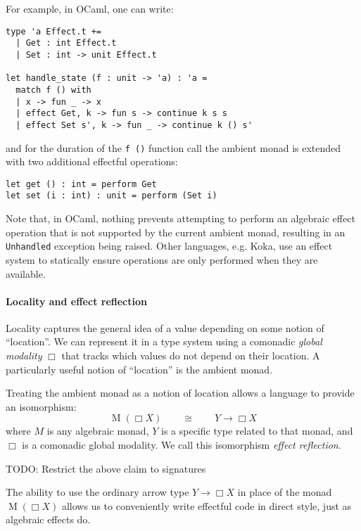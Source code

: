 \documentclass[acmsmall, screen, nonacm]{acmart}
\theoremstyle{definition}
\newcommand{\glob}{\mathop{\Box}}
\newcommand{\todo}[1]{{\color{red}TODO: #1}}
\begin{document}
For example, in OCaml, one can write:
\begin{lstlisting}[style=ocaml]
type 'a Effect.t +=
  | Get : int Effect.t
  | Set : int -> unit Effect.t

let handle_state (f : unit -> 'a) : 'a =
  match f () with
  | x -> fun _ -> x
  | effect Get, k -> fun s -> continue k s s
  | effect Set s', k -> fun _ -> continue k () s'
\end{lstlisting}
and for the duration of the \lstinline[style=ocaml]{f ()} function call
the ambient monad is extended with two additional effectful operations:
\begin{lstlisting}[style=ocaml]
let get () : int = perform Get
let set (i : int) : unit = perform (Set i)
\end{lstlisting}

Note that, in OCaml, nothing prevents attempting to perform an algebraic
effect operation that is not supported by the current ambient monad,
resulting in an \lstinline[style=ocaml]{Unhandled} exception being
raised. Other languages, e.g. Koka\cite{??}, use an effect system to
statically ensure operations are only performed when they are available.

\paragraph{Locality and effect reflection}
Locality captures the general idea of a value depending on some notion
of ``location''. We can represent it in a type system using a comonadic
\emph{global modality} $\glob$ that tracks which values do not depend on
their location. A particularly useful notion of ``location'' is the
ambient monad.

Treating the ambient monad as a notion of location allows a language to
provide an isomorphism:
\begin{equation*}
  \mathop{M}(\glob X) \qquad \cong \qquad Y \mathbin{\rightarrow} \glob X
\end{equation*}
where $M$ is any algebraic monad, $Y$ is a specific type related to that
monad, and $\glob$ is a comonadic global modality. We call this
isomorphism \emph{effect reflection}.

\todo{Restrict the above claim to signatures}

The ability to use the ordinary arrow type
$Y \mathbin{\rightarrow} \glob X$ in place of the monad
$\mathop{M}(\glob X)$ allows us to conveniently write effectful
code in direct style, just as algebraic effects do.
\end{document}
